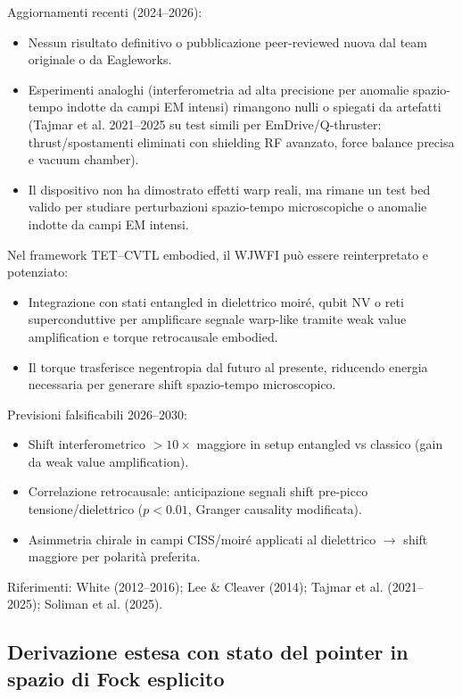 \documentclass[11pt,a4paper]{article}
\theoremstyle{plain}
\theoremstyle{definition}
\begin{document}
Aggiornamenti recenti (2024–2026):
\begin{itemize}
    \item Nessun risultato definitivo o pubblicazione peer-reviewed nuova dal team originale o da Eagleworks.
    \item Esperimenti analoghi (interferometria ad alta precisione per anomalie spazio-tempo indotte da campi EM intensi) rimangono nulli o spiegati da artefatti (Tajmar et al. 2021–2025 su test simili per EmDrive/Q-thruster: thrust/spostamenti eliminati con shielding RF avanzato, force balance precisa e vacuum chamber).
    \item Il dispositivo non ha dimostrato effetti warp reali, ma rimane un test bed valido per studiare perturbazioni spazio-tempo microscopiche o anomalie indotte da campi EM intensi.
\end{itemize}

Nel framework TET–CVTL embodied, il WJWFI può essere reinterpretato e potenziato:
\begin{itemize}
    \item Integrazione con stati entangled in dielettrico moiré, qubit NV o reti superconduttive per amplificare segnale warp-like tramite weak value amplification e torque retrocausale embodied.
    \item Il torque trasferisce negentropia dal futuro al presente, riducendo energia necessaria per generare shift spazio-tempo microscopico.
\end{itemize}

Previsioni falsificabili 2026–2030:
\begin{itemize}
    \item Shift interferometrico $>10\times$ maggiore in setup entangled vs classico (gain da weak value amplification).
    \item Correlazione retrocausale: anticipazione segnali shift pre-picco tensione/dielettrico ($p < 0.01$, Granger causality modificata).
    \item Asimmetria chirale in campi CISS/moiré applicati al dielettrico $\to$ shift maggiore per polarità preferita.
\end{itemize}

Riferimenti: White (2012–2016); Lee \& Cleaver (2014); Tajmar et al. (2021–2025); Soliman et al. (2025).





\subsection{Derivazione estesa con stato del pointer in spazio di Fock esplicito}
\end{document}
